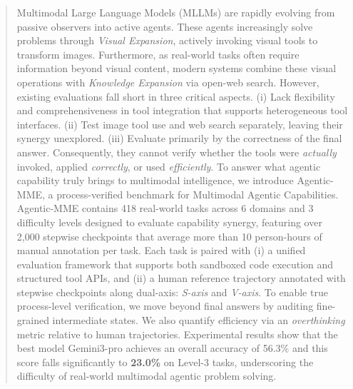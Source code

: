 \documentclass[runningheads]{llncs}
\theoremstyle{plain}
\theoremstyle{definition}
\theoremstyle{remark}
\begin{document}
\maketitle
\begin{abstract}
Multimodal Large Language Models (MLLMs) are rapidly evolving from passive observers into active agents. These agents increasingly solve problems through \textit{Visual Expansion}, actively invoking visual tools to transform images. Furthermore, as real-world tasks often require information beyond visual content, modern systems combine these visual operations with \textit{Knowledge Expansion} via open-web search. However, existing evaluations fall short in three critical aspects. (i) Lack flexibility and comprehensiveness in tool integration that supports heterogeneous tool interfaces. (ii) Test image tool use and web search separately, leaving their synergy unexplored. (iii) Evaluate primarily by the correctness of the final answer. Consequently, they cannot verify whether the tools were \textit{actually} invoked, applied \textit{correctly}, or used \textit{efficiently}.  To answer what agentic capability truly brings to multimodal intelligence, we introduce Agentic-MME, a process-verified benchmark for Multimodal Agentic Capabilities. Agentic-MME contains 418 real-world tasks across 6 domains and 3 difficulty levels designed to evaluate capability synergy, featuring over 2,000 stepwise checkpoints that average more than 10 person-hours of manual annotation per task. Each task is paired with (i) a unified evaluation framework that supports both sandboxed code execution and structured tool APIs, and (ii) a human reference trajectory annotated with stepwise checkpoints along dual-axis: \textit{S-axis} and \textit{V-axis}. To enable true process-level verification, we move beyond final answers by auditing fine-grained intermediate states. We also quantify efficiency via an \textit{overthinking} metric relative to human trajectories. Experimental results show that the best model Gemini3-pro achieves an overall accuracy of 56.3\% and this score falls significantly to \textbf{23.0\%} on Level-3 tasks, underscoring the difficulty of real-world multimodal agentic problem solving. 
\end{abstract}
\end{document}
